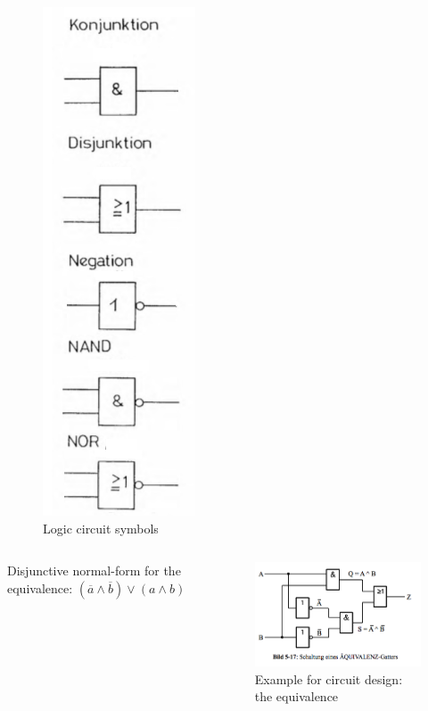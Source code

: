 \documentclass{beamer}
\begin{document}
\begin{frame}
  \begin{figure}[H]
\centering
  \includegraphics[height=0.6\textwidth]{logic_symbols}%
  \caption{Logic circuit symbols}%
  \label{fig:logic_symbols}
\end{figure}
\end{frame}


\begin{frame}
  \begin{columns}
  \begin{column}{5cm}
  Disjunctive normal-form for the equivalence: 
  \newline\newline
  $(\overline{a}\land \overline{b})\lor(a\land b)$
  \end{column}
  
  \begin{column}{6cm}
    \begin{figure}[H]
      \centering
      \includegraphics[width=1\textwidth]{equivalence}%
      \caption{Example for circuit design: the equivalence}%
      \label{fig:equivalence}
    \end{figure}
  \end{column}
  \end{columns}  
\end{frame}
\end{document}
